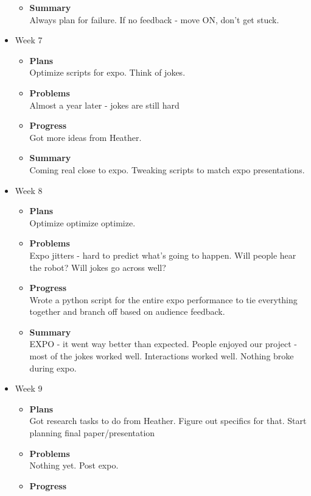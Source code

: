 \begin{itemize}
\begin{itemize}
				\item \textbf{Summary} \\
				Always plan for failure. If no feedback - move ON, don't get stuck.
			\end{itemize}
		\item{Week 7}
			\begin{itemize}
				\item \textbf{Plans} \\
				Optimize scripts for expo. Think of jokes.
				\item \textbf{Problems} \\
				Almost a year later - jokes are still hard
				\item \textbf{Progress} \\
				Got more ideas from Heather. 
				\item \textbf{Summary} \\
				Coming real close to expo. Tweaking scripts to match expo presentations.
			\end{itemize}
		\item{Week 8}
			\begin{itemize}
				\item \textbf{Plans} \\
				Optimize optimize optimize.
				\item \textbf{Problems} \\
				Expo jitters - hard to predict what's going to happen. Will people hear the robot? Will jokes go across well?
				\item \textbf{Progress} \\
				Wrote a python script for the entire expo performance to tie everything together and branch off based on audience feedback.
				\item \textbf{Summary} \\
				EXPO - it went way better than expected. People enjoyed our project - most of the jokes worked well. Interactions worked well. Nothing broke during expo.
			\end{itemize}
		\item{Week 9}
			\begin{itemize}
				\item \textbf{Plans} \\
				Got research tasks to do from Heather. Figure out specifics for that. Start planning final paper/presentation
				\item \textbf{Problems} \\
				Nothing yet. Post expo.
				\item \textbf{Progress} \\

\end{itemize}
\end{itemize}
